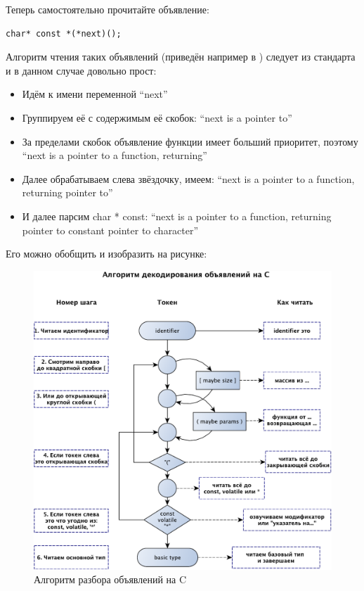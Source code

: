 \documentclass[a4paper,12pt,oneside]{article}
\begin{document}
Теперь самостоятельно прочитайте объявление:

\begin{lstlisting}
char* const *(*next)();
\end{lstlisting}

Алгоритм чтения таких объявлений (приведён например в \cite{linden}) следует из стандарта и в данном случае довольно прост:

\begin{itemize}
\item
Идём к имени переменной ``next''
\item
Группируем её с содержимым её скобок: ``next is a pointer to''
\item
За пределами скобок объявление функции имеет больший приоритет, поэтому ``next is a pointer to a function, returning''
\item
Далее обрабатываем слева звёздочку, имеем: ``next is a pointer to a function, returning pointer to''
\item
И далее парсим char * const: ``next is a pointer to a function, returning pointer to constant pointer to character''
\end{itemize}

Его можно обобщить и изобразить на рисунке:
\begin{figure}[h!]
\centering
\includegraphics[width=1.0\textwidth]{illustrations/cdecls-crop.pdf}
\caption{Алгоритм разбора объявлений на C}
\label{fig:cdecl_parse}
\end{figure}
\end{document}
